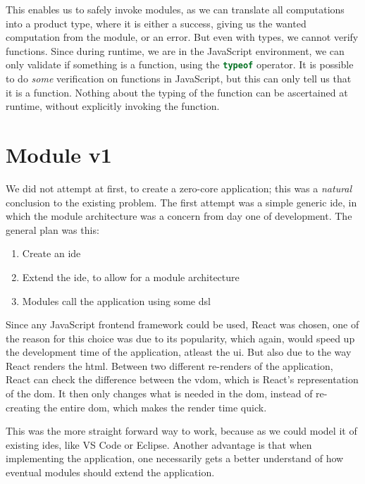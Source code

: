 This enables us to safely invoke modules, as we can translate all computations
into a product type, where it is either a success, giving us the wanted
computation from the module, or an error. But even with types, we cannot verify
functions. Since during runtime, we are in the JavaScript environment, we can
only validate if something is a function, using the
\lstinline[language=JavaScript]{typeof} operator. It is possible to do
\textit{some} verification on functions in JavaScript, but this can only tell us
that it is a function. Nothing about the typing of the function can be
ascertained at runtime, without explicitly invoking the function.


\section{Module v1} \label{sec:mod1}

We did not attempt at first, to create a zero-core application; this was a
\textit{natural} conclusion to the existing problem. The first attempt was a
simple generic \gls*{ide}, in which the module architecture was a concern from
day one of development. The general plan was this:

\begin{enumerate}
  \item Create an \gls*{ide}
  \item Extend the \gls*{ide}, to allow for a module architecture
  \item Modules call the application using some \gls*{dsl}
\end{enumerate}

Since any JavaScript frontend framework could be used, React was chosen, one of
the reason for this choice was due to its popularity, which again, would speed
up the development time of the application, atleast the \gls*{ui}. But also due
to the way React renders the \gls*{html}. Between two different re-renders of
the application, React can check the difference between the \gls*{vdom}, which
is React's representation of the \gls*{dom}. It then only changes what is needed
in the \gls*{dom}, instead of re-creating the entire \gls*{dom}, which makes the
render time quick.

This was the more straight forward way to work, because as we could model it of
existing \gls*{ide}s, like VS Code or Eclipse. Another advantage is that when
implementing the application, one necessarily gets a better understand of how
eventual modules should extend the application.

